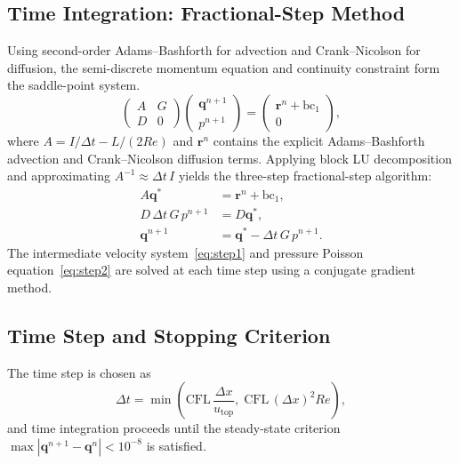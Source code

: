 \documentclass[
  aapm,
  amsmath,amssymb,
  reprint,          %
  floatfix
]{revtex4-2}
\begin{document}
\subsection{Time Integration: Fractional-Step Method}
%
%
Using second-order Adams--Bashforth for advection and Crank--Nicolson for diffusion,
the semi-discrete momentum equation and continuity constraint form the saddle-point
system.
\begin{equation}
  \begin{pmatrix} A & G \\ D & 0 \end{pmatrix}
  \begin{pmatrix} \bm{q}^{n+1} \\ p^{n+1} \end{pmatrix}
  = \begin{pmatrix} \bm{r}^n + \text{bc}_1 \\ 0 \end{pmatrix},
  \label{eq:saddle}
\end{equation}
where $A = I/\Delta t - L/(2 Re)$ and $\bm{r}^n$ contains the explicit
Adams--Bashforth advection and Crank--Nicolson diffusion terms. Applying block LU
decomposition and approximating $A^{-1}\approx\Delta t\,I$ yields the three-step
fractional-step algorithm:
\begin{align}
  A\bm{q}^{*} &= \bm{r}^n + \text{bc}_1,    \label{eq:step1}\\
  D\,\Delta t\,G\,p^{n+1} &= D\bm{q}^{*},   \label{eq:step2}\\
  \bm{q}^{n+1} &= \bm{q}^{*} - \Delta t\,G\,p^{n+1}. \label{eq:step3}
\end{align}
The intermediate velocity system~\eqref{eq:step1} and pressure Poisson
equation~\eqref{eq:step2} are solved at each time step using a conjugate gradient
method.

\subsection{Time Step and Stopping Criterion}
%
%
The time step is chosen as
\begin{equation}
  \Delta t = \min\!\left(\text{CFL}\,\frac{\Delta x}{u_\text{top}},\;
             \text{CFL}\,(\Delta x)^2 Re\right),
\end{equation}
and time integration proceeds until the steady-state criterion
$\max|\bm{q}^{n+1}-\bm{q}^n|<10^{-8}$ is satisfied.
\end{document}
